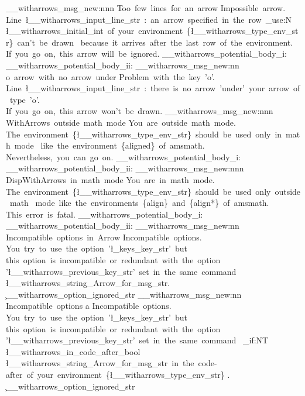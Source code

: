 \__witharrows_msg_new:nnn
  { Too~few~lines~for~an~arrow }
  {
    Impossible~arrow.\\
    Line~\l__witharrows_input_line_str\
    :~an~arrow~specified~in~the~row~\int_use:N \l__witharrows_initial_int\
    of~your~environment~\{\l__witharrows_type_env_str\}~can't~be~drawn~
    because~it~arrives~after~the~last~row~of~the~environment. \\
    If~you~go~on,~this~arrow~will~be~ignored.
    \__witharrows_potential_body_i:
  }
  { \__witharrows_potential_body_ii: }
\__witharrows_msg_new:nn { o~arrow~with~no~arrow~under }
  {
    Problem~with~the~key~'o'.\\
    Line~\l__witharrows_input_line_str\
    :~there~is~no~arrow~'under'~your~arrow~of~type~'o'.\\
    If~you~go~on,~this~arrow~won't~be~drawn.
  }
\__witharrows_msg_new:nnn { WithArrows~outside~math~mode }
  {
    You~are~outside~math~mode.\\
    The~environment~\{\l__witharrows_type_env_str\}~should~be~used~only~in~math~mode~
    like~the~environment~\{aligned\}~of~amsmath. \\
    Nevertheless,~you~can~go~on.
    \__witharrows_potential_body_i:
  }
  { \__witharrows_potential_body_ii: }
\__witharrows_msg_new:nnn { DispWithArrows~in~math~mode }
  {
    You~are~in~math~mode.\\
    The~environment~\{\l__witharrows_type_env_str\}~should~be~used~only~outside~math~
    mode~like~the~environments~\{align\}~and~\{align*\}~of~amsmath. \\
    This~error~is~fatal.
    \__witharrows_potential_body_i:
  }
  { \__witharrows_potential_body_ii: }
\__witharrows_msg_new:nn { Incompatible~options~in~Arrow }
  {
    Incompatible~options.\\
    You~try~to~use~the~option~'\l_keys_key_str'~but~
    this~option~is~incompatible~or~redundant~with~the~option~
    '\l__witharrows_previous_key_str'~set~in~the~same~command~
    \l__witharrows_string_Arrow_for_msg_str. \\
    \c__witharrows_option_ignored_str
  }
\__witharrows_msg_new:nn { Incompatible~options a}
  {
    Incompatible~options.\\
    You~try~to~use~the~option~'\l_keys_key_str'~but~
    this~option~is~incompatible~or~redundant~with~the~option~
    '\l__witharrows_previous_key_str'~set~in~the~same~command~
    \bool_if:NT \l__witharrows_in_code_after_bool
      {
        \l__witharrows_string_Arrow_for_msg_str\
        in~the~code-after~of~your~environment~\{\l__witharrows_type_env_str\}
      }. \\
    \c__witharrows_option_ignored_str
  }
